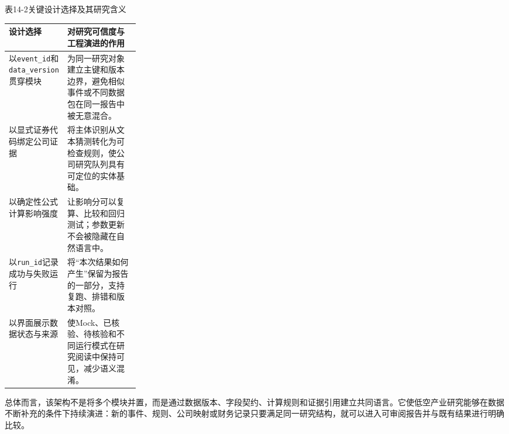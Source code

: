 \begin{center}\small 表14-2\quad 关键设计选择及其研究含义\par\vspace{1mm}
\begin{tabularx}{\linewidth}{p{0.26\linewidth}X}
\toprule
设计选择 & 对研究可信度与工程演进的作用\\
\midrule
以\texttt{event\_id}和\texttt{data\_version}贯穿模块 & 为同一研究对象建立主键和版本边界，避免相似事件或不同数据包在同一报告中被无意混合。\\
以显式证券代码绑定公司证据 & 将主体识别从文本猜测转化为可检查规则，使公司研究队列具有可定位的实体基础。\\
以确定性公式计算影响强度 & 让影响分可以复算、比较和回归测试；参数更新不会被隐藏在自然语言中。\\
以\texttt{run\_id}记录成功与失败运行 & 将“本次结果如何产生”保留为报告的一部分，支持复跑、排错和版本对照。\\
以界面展示数据状态与来源 & 使Mock、已核验、待核验和不同运行模式在研究阅读中保持可见，减少语义混淆。\\
\bottomrule
\end{tabularx}\end{center}

总体而言，该架构不是将多个模块并置，而是通过数据版本、字段契约、计算规则和证据引用建立共同语言。它使低空产业研究能够在数据不断补充的条件下持续演进：新的事件、规则、公司映射或财务记录只要满足同一研究结构，就可以进入可审阅报告并与既有结果进行明确比较。
